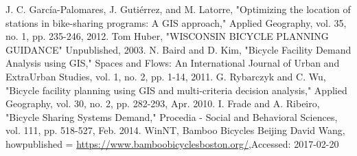 \documentclass[journal, letterpaper]{IEEEtran}
\begin{document}
\begin{thebibliography}{99}
\large
{} J. C. García-Palomares, J. Gutiérrez, and M. Latorre, "Optimizing the location of stations in bike-sharing programs: A GIS approach," Applied Geography, vol. 35, no. 1, pp. 235-246, 2012.
 Tom Huber, "WISCONSIN BICYCLE PLANNING GUIDANCE" Unpublished, 2003.
 N. Baird and D. Kim, "Bicycle Facility Demand Analysis using GIS," Spaces and Flows: An International Journal of Urban and ExtraUrban Studies, vol. 1, no. 2, pp. 1-14, 2011.
 G. Rybarczyk and C. Wu, "Bicycle facility planning using GIS and multi-criteria decision analysis," Applied Geography, vol. 30, no. 2, pp. 282-293, Apr. 2010.
 I. Frade and A. Ribeiro, "Bicycle Sharing Systems Demand," Procedia - Social and Behavioral Sciences, vol. 111, pp. 518-527, Feb. 2014.
 {WinNT, {{ Bamboo Bicycles Beijing} David Wang}, howpublished = {\url{https://www.bamboobicyclesboston.org/}},{Accessed: 2017-02-20}}

\end{thebibliography}
\end{document}
